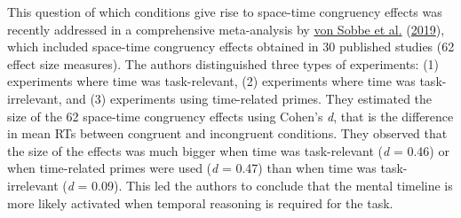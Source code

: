 \documentclass[
  a4paper,12pt,twoside,onecolumn,openright,final,oldfontcommands]{memoir}
\begin{document}
This question of which conditions give rise to space-time congruency effects was recently addressed in a comprehensive meta-analysis by \protect\hyperlink{ref-von_sobbe_space-time_2019}{von Sobbe et al.} (\protect\hyperlink{ref-von_sobbe_space-time_2019}{2019}), which included space-time congruency effects obtained in 30 published studies (62 effect size measures). The authors distinguished three types of experiments: (1) experiments where time was task-relevant, (2) experiments where time was task-irrelevant, and (3) experiments using time-related primes. They estimated the size of the 62 space-time congruency effects using Cohen's \emph{d}, that is the difference in mean RTs between congruent and incongruent conditions. They observed that the size of the effects was much bigger when time was task-relevant (\emph{d} = 0.46) or when time-related primes were used (\emph{d} = 0.47) than when time was task-irrelevant (\emph{d} = 0.09). This led the authors to conclude that the mental timeline is more likely activated when temporal reasoning is required for the task.
\end{document}
